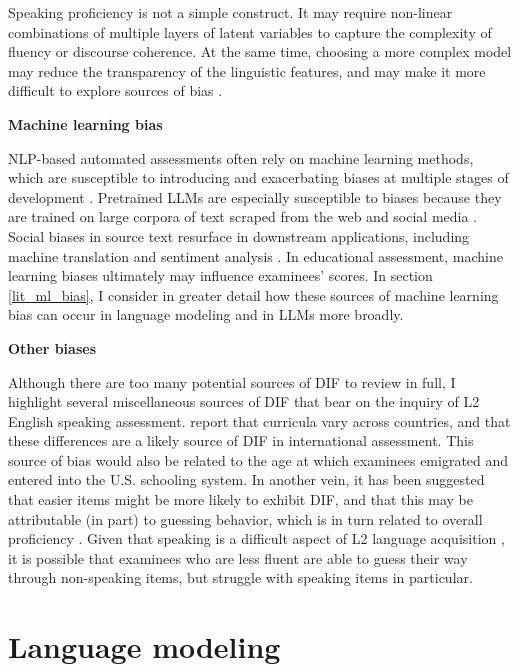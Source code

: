 \documentclass [PhD] {uclathes}
\begin{document}
Speaking proficiency is not a simple construct. It may require non-linear combinations of multiple layers of latent variables to capture the complexity of fluency or discourse coherence. At the same time, choosing a more complex model may reduce the transparency of the linguistic features, and may make it more difficult to explore sources of bias \citep{loukina2019scoring}.

\noindent \textbf{Machine learning bias} \;

NLP-based automated assessments often rely on machine learning methods, which are susceptible to introducing and exacerbating biases at multiple stages of development \citep{suresh2021framework}. Pretrained LLMs are especially susceptible to biases because they are trained on large corpora of text scraped from the web and social media \citep{blodgett2020}. Social biases in source text resurface in downstream applications, including machine translation \citep{stanovsky2019evaluating} and sentiment analysis \citep{kiritchenko2018examining}. In educational assessment, machine learning biases ultimately may influence examinees’ scores. In section \ref{lit_ml_bias}, I consider in greater detail how these sources of machine learning bias can occur in language modeling and in LLMs more broadly. 

\noindent \textbf{Other biases} \;

Although there are too many potential sources of DIF to review in full, I highlight several miscellaneous sources of DIF that bear on the inquiry of L2 English speaking assessment. \citet{huang2016exploring} report that curricula vary across countries, and that these differences are a likely source of DIF in international assessment. This source of bias would also be related to the age at which examinees emigrated and entered into the U.S. schooling system. In another vein, it has been suggested that easier items might be more likely to exhibit DIF, and that this may be attributable (in part) to guessing behavior, which is in turn related to overall proficiency \citep{dorans2004examining, santelices2010unfair}. Given that speaking is a difficult aspect of L2 language acquisition \citep{brown2000principles}, it is possible that examinees who are less fluent are able to guess their way through non-speaking items, but struggle with speaking items in particular.

\section{Language modeling}
\end{document}
